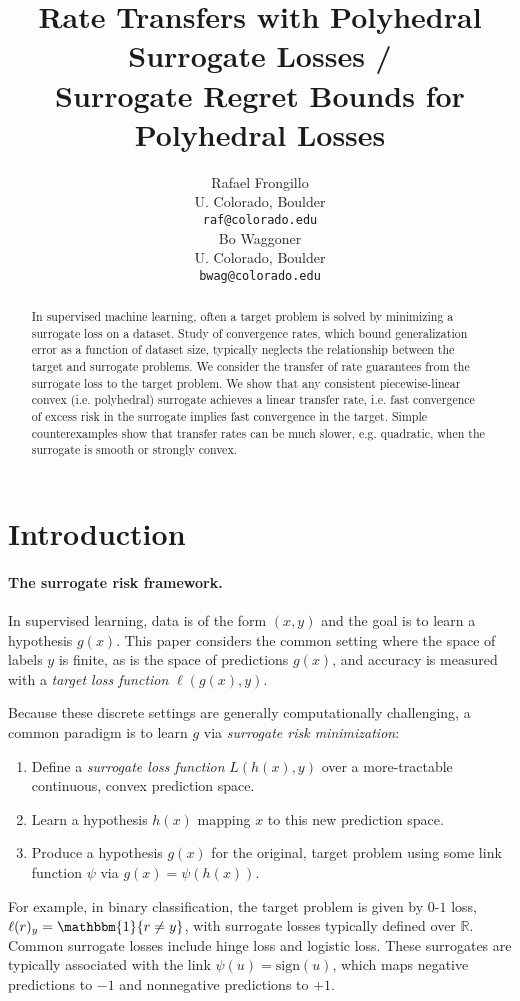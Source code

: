 \documentclass{article}
\title{Rate Transfers with Polyhedral Surrogate Losses /\\
  Surrogate Regret Bounds for Polyhedral Losses}
\author{%
  Rafael Frongillo \\
  U. Colorado, Boulder \\
  \texttt{raf@colorado.edu} \\
  \And
  Bo Waggoner \\
  U. Colorado, Boulder \\
  \texttt{bwag@colorado.edu}
}
\newcommand{\reals}{\mathbb{R}}
\newcommand{\ones}{\mathbbm{1}}
\begin{document}
\maketitle

\begin{abstract}
  In supervised machine learning, often a target problem is solved by minimizing a surrogate loss on a dataset.
  Study of convergence rates, which bound generalization error as a function of dataset size, typically neglects the relationship between the target and surrogate problems.
  We consider the transfer of rate guarantees from the surrogate loss to the target problem.
  We show that any consistent piecewise-linear convex (i.e. polyhedral) surrogate achieves a linear transfer rate, i.e. fast convergence of excess risk in the surrogate implies fast convergence in the target.
  Simple counterexamples show that transfer rates can be much slower, e.g. quadratic, when the surrogate is smooth or strongly convex.
\end{abstract}



\section{Introduction}
\paragraph{The surrogate risk framework.}
In supervised learning, data is of the form $(x,y)$ and the goal is to learn a hypothesis $g(x)$.
This paper considers the common setting where the space of labels $y$ is finite, as is the space of predictions $g(x)$, and accuracy is measured with a \emph{target loss function} $\ell(g(x),y)$.

Because these discrete settings are generally computationally challenging, a common paradigm is to learn $g$ via \emph{surrogate risk minimization}:
\begin{enumerate}
  \item Define a \emph{surrogate loss function} $L(h(x),y)$ over a more-tractable continuous, convex prediction space.
  \item Learn a hypothesis $h(x)$ mapping $x$ to this new prediction space.
  \item Produce a hypothesis $g(x)$ for the original, target problem using some link function $\psi$ via $g(x) = \psi(h(x))$.
\end{enumerate}
For example, in binary classification, the target problem is given by $0$-$1$ loss, $\ell(r)_y = \ones\{r\neq y\}$, with surrogate losses typically defined over $\reals$.
Common surrogate losses include hinge loss and logistic loss.
These surrogates are typically associated with the link $\psi(u) = \mathrm{sign}(u)$, which maps negative predictions to $-1$ and nonnegative predictions to $+1$.
\end{document}
